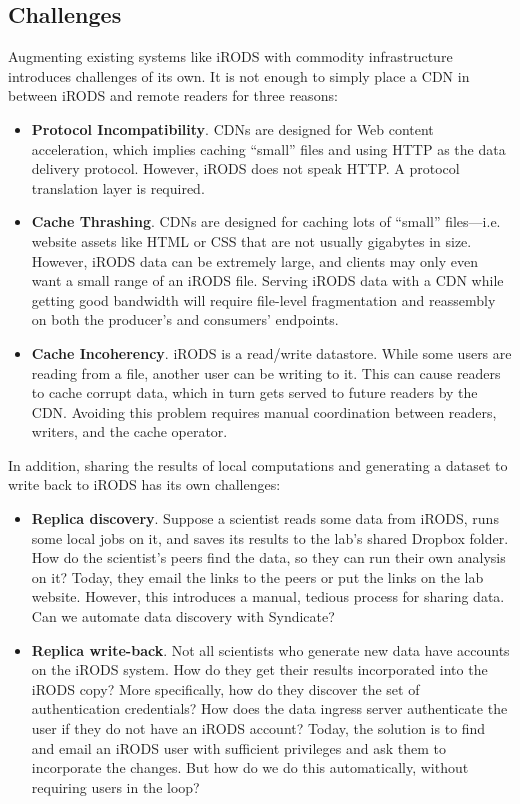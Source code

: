 \subsection{Challenges}

Augmenting existing systems like iRODS
with commodity infrastructure introduces challenges of
its own.  It is not enough to simply place a CDN in between iRODS and remote readers for
three reasons:

\begin{itemize}
\item \textbf{Protocol Incompatibility}.  CDNs are designed for Web content
acceleration, which implies caching ``small'' files and
using HTTP as the data delivery protocol.  However,
iRODS does not speak HTTP.  A protocol translation layer is required.
\item \textbf{Cache Thrashing}.  CDNs are designed for caching lots of
``small'' files---i.e. website assets like HTML or CSS that are not usually
gigabytes in size.  However, iRODS data can be extremely large, and clients may
only even want a small range of an iRODS file.  Serving iRODS data with a CDN
while getting good bandwidth will require file-level fragmentation and reassembly
on both the producer's and consumers' endpoints.
\item \textbf{Cache Incoherency}.  iRODS is a read/write datastore.
While some users are reading from a file, another user can be writing to it.
This can cause readers to cache corrupt data, which in turn gets served to
future readers by the CDN.  Avoiding this problem requires manual coordination
between readers, writers, and the cache operator.
\end{itemize}

In addition, sharing the results of local computations and generating a
dataset to write back to iRODS has its own challenges:

\begin{itemize}
\item \textbf{Replica discovery}.  Suppose a scientist reads some data from iRODS,
runs some local jobs on it, and saves its results to the lab's shared Dropbox
folder.  How do the scientist's peers find the data, so they can run their own
analysis on it?  Today, they email the links to the peers or put the links on the lab
website.  However, this introduces a manual, tedious process for sharing data.  Can we
automate data discovery with Syndicate?
\item \textbf{Replica write-back}.  Not all scientists who generate new data
have accounts on the iRODS system.  How do they get their results incorporated
into the iRODS copy?  More specifically, how do they discover the set of
authentication credentials?  How does the data ingress server authenticate the
user if they do not have an iRODS account?  Today, the solution is to find
and email an iRODS user with sufficient privileges and ask them to incorporate
the changes.  But how do we do this automatically, without requiring users
in the loop?
\end{itemize}

